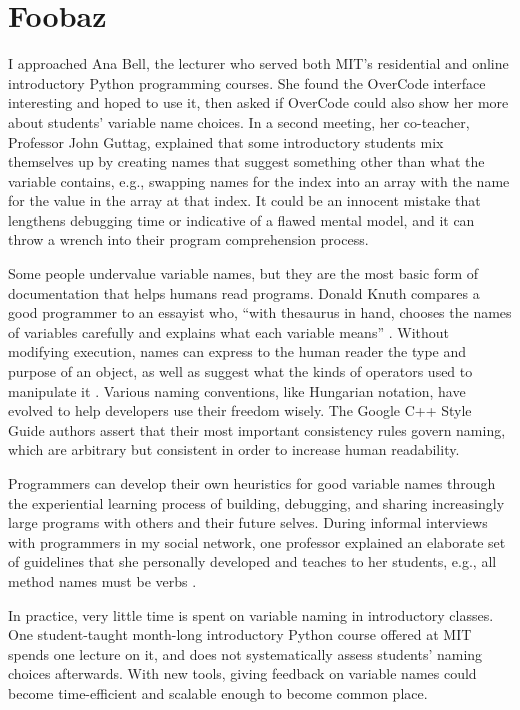 \section{Foobaz}

I approached Ana Bell, the lecturer who served both MIT's residential and online introductory Python programming courses. She found the OverCode interface interesting and hoped to use it, then asked if OverCode could also show her more about students' variable name choices. In a second meeting, her co-teacher, Professor John Guttag, explained that some introductory students mix themselves up by creating names that suggest something other than what the variable contains, e.g., swapping names for the index into an array with the name for the value in the array at that index. It could be an innocent mistake that lengthens debugging time or indicative of a flawed mental model, and it can throw a wrench into their program comprehension process. 

Some people undervalue variable names, but they are the most basic form of documentation that helps humans read programs. Donald Knuth compares a good programmer to an essayist who, ``with thesaurus in hand, chooses the names of variables carefully and explains what each variable means'' \cite{literateprogramming}. Without modifying execution, names can express to the human reader the type and purpose of an object, as well as suggest what the kinds of operators used to manipulate it \cite{operands}. Various naming conventions, like Hungarian notation, have evolved to help developers use their freedom wisely. The Google C++ Style Guide authors assert that their most important consistency rules govern naming, which are arbitrary but consistent in order to increase human readability. 

Programmers can develop their own heuristics for good variable names through the experiential learning process of building, debugging, and sharing increasingly large programs with others and their future selves. During informal interviews with programmers in my social network, one professor explained an elaborate set of guidelines that she personally developed and teaches to her students, e.g., all method names must be verbs \cite{doshiconversation}.

In practice, very little time is spent on variable naming in introductory classes. One student-taught month-long introductory Python course offered at MIT spends one lecture on it, and does not systematically assess students' naming choices afterwards. With new tools, giving feedback on variable names could become time-efficient and scalable enough to become common place. 


